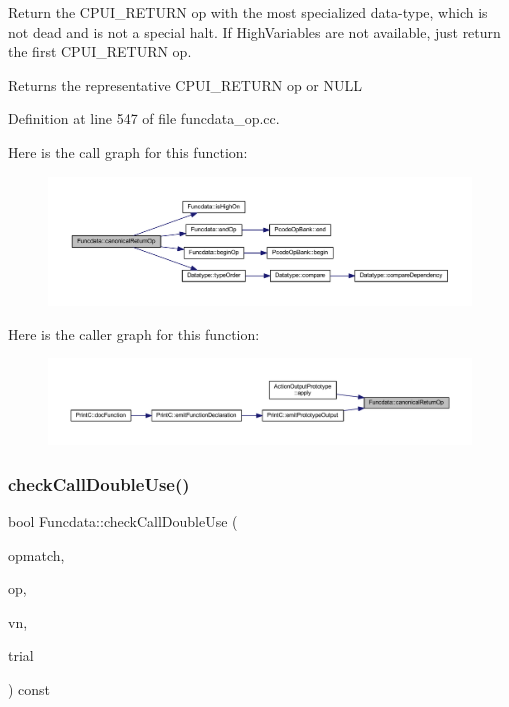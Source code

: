 Return the C\+P\+U\+I\+\_\+\+R\+E\+T\+U\+RN op with the most specialized data-\/type, which is not dead and is not a special halt. If High\+Variables are not available, just return the first C\+P\+U\+I\+\_\+\+R\+E\+T\+U\+RN op. \begin{DoxyReturn}{Returns}
the representative C\+P\+U\+I\+\_\+\+R\+E\+T\+U\+RN op or N\+U\+LL 
\end{DoxyReturn}


Definition at line 547 of file funcdata\+\_\+op.\+cc.

Here is the call graph for this function\+:
\nopagebreak
\begin{figure}[H]
\begin{center}
\leavevmode
\includegraphics[width=350pt]{class_funcdata_a2e96275c93ab53257f8b56d6ee9737bb_cgraph}
\end{center}
\end{figure}
Here is the caller graph for this function\+:
\nopagebreak
\begin{figure}[H]
\begin{center}
\leavevmode
\includegraphics[width=350pt]{class_funcdata_a2e96275c93ab53257f8b56d6ee9737bb_icgraph}
\end{center}
\end{figure}
\mbox{\label{class_funcdata_add076d930ec2ceb66453451e478ca7d4}} 
\subsubsection{\texorpdfstring{checkCallDoubleUse()}{checkCallDoubleUse()}}
{\footnotesize\ttfamily bool Funcdata\+::check\+Call\+Double\+Use (\begin{DoxyParamCaption}\item[{const \mbox{\hyperlink{class_pcode_op}{Pcode\+Op}} $\ast$}]{opmatch,  }\item[{const \mbox{\hyperlink{class_pcode_op}{Pcode\+Op}} $\ast$}]{op,  }\item[{const \mbox{\hyperlink{class_varnode}{Varnode}} $\ast$}]{vn,  }\item[{const \mbox{\hyperlink{class_param_trial}{Param\+Trial}} \&}]{trial }\end{DoxyParamCaption}) const}



